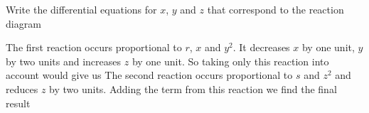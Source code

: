 Write the differential equations for $x$, $y$ and $z$ that correspond to the reaction diagram

\solution
The first reaction occurs proportional to $r$, $x$ and $y^2$. It decreases $x$ by one unit, $y$ by two units and increases $z$ by one unit. So taking only this reaction into account would give us 
The second reaction occurs proportional to $s$ and $z^2$ and reduces $z$ by two units. Adding the term from this reaction we find the final result
